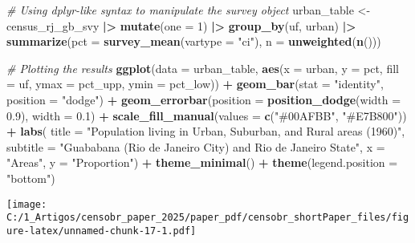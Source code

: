 \documentclass[
]{article}
\newenvironment{Shaded}{\begin{snugshade}}{\end{snugshade}}
\newcommand{\AttributeTok}[1]{\textcolor[rgb]{0.13,0.29,0.53}{#1}}
\newcommand{\CommentTok}[1]{\textcolor[rgb]{0.56,0.35,0.01}{\textit{#1}}}
\newcommand{\DecValTok}[1]{\textcolor[rgb]{0.00,0.00,0.81}{#1}}
\newcommand{\FloatTok}[1]{\textcolor[rgb]{0.00,0.00,0.81}{#1}}
\newcommand{\FunctionTok}[1]{\textcolor[rgb]{0.13,0.29,0.53}{\textbf{#1}}}
\newcommand{\NormalTok}[1]{#1}
\newcommand{\OtherTok}[1]{\textcolor[rgb]{0.56,0.35,0.01}{#1}}
\newcommand{\SpecialCharTok}[1]{\textcolor[rgb]{0.81,0.36,0.00}{\textbf{#1}}}
\newcommand{\StringTok}[1]{\textcolor[rgb]{0.31,0.60,0.02}{#1}}
\begin{document}
\begin{Shaded}
\begin{Highlighting}[]
\CommentTok{\# Using dplyr{-}like syntax to manipulate the survey object}
\NormalTok{urban\_table }\OtherTok{\textless{}{-}}\NormalTok{ census\_rj\_gb\_svy }\SpecialCharTok{|\textgreater{}}
        \FunctionTok{mutate}\NormalTok{(}\AttributeTok{one =} \DecValTok{1}\NormalTok{) }\SpecialCharTok{|\textgreater{}}
        \FunctionTok{group\_by}\NormalTok{(uf, urban) }\SpecialCharTok{|\textgreater{}}
        \FunctionTok{summarize}\NormalTok{(}\AttributeTok{pct =} \FunctionTok{survey\_mean}\NormalTok{(}\AttributeTok{vartype =} \StringTok{"ci"}\NormalTok{),}
                  \AttributeTok{n =} \FunctionTok{unweighted}\NormalTok{(}\FunctionTok{n}\NormalTok{()))}

\CommentTok{\# Plotting the results}
\FunctionTok{ggplot}\NormalTok{(}\AttributeTok{data =}\NormalTok{ urban\_table,}
       \FunctionTok{aes}\NormalTok{(}\AttributeTok{x =}\NormalTok{ urban, }
           \AttributeTok{y =}\NormalTok{ pct, }
           \AttributeTok{fill =}\NormalTok{ uf,}
           \AttributeTok{ymax =}\NormalTok{ pct\_upp, }
           \AttributeTok{ymin =}\NormalTok{ pct\_low)) }\SpecialCharTok{+}
  \FunctionTok{geom\_bar}\NormalTok{(}\AttributeTok{stat =} \StringTok{"identity"}\NormalTok{, }\AttributeTok{position =} \StringTok{"dodge"}\NormalTok{) }\SpecialCharTok{+}
  \FunctionTok{geom\_errorbar}\NormalTok{(}\AttributeTok{position =} \FunctionTok{position\_dodge}\NormalTok{(}\AttributeTok{width =} \FloatTok{0.9}\NormalTok{), }\AttributeTok{width =} \FloatTok{0.1}\NormalTok{) }\SpecialCharTok{+}
  \FunctionTok{scale\_fill\_manual}\NormalTok{(}\AttributeTok{values =} \FunctionTok{c}\NormalTok{(}\StringTok{"\#00AFBB"}\NormalTok{, }\StringTok{"\#E7B800"}\NormalTok{)) }\SpecialCharTok{+}
  \FunctionTok{labs}\NormalTok{(}
          \AttributeTok{title =} \StringTok{"Population living in Urban, Suburban, and Rural areas (1960)"}\NormalTok{,}
          \AttributeTok{subtitle =} \StringTok{"Guababana (Rio de Janeiro City) and Rio de Janeiro State"}\NormalTok{,}
          \AttributeTok{x =} \StringTok{"Areas"}\NormalTok{,}
          \AttributeTok{y =} \StringTok{"Proportion"}\NormalTok{) }\SpecialCharTok{+}
  \FunctionTok{theme\_minimal}\NormalTok{() }\SpecialCharTok{+}
  \FunctionTok{theme}\NormalTok{(}\AttributeTok{legend.position =} \StringTok{"bottom"}\NormalTok{)}
\end{Highlighting}
\end{Shaded}

\texttt{[image: C:/1\_Artigos/censobr\_paper\_2025/paper\_pdf/censobr\_shortPaper\_files/figure-latex/unnamed-chunk-17-1.pdf]}
\end{document}
